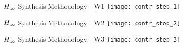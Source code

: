 \documentclass[../main/main.tex]{subfiles}
\begin{document}
\begin{frame}{\(H_{\infty}\) Synthesis Methodology - W1}
  \centering
  \texttt{[image: contr\_step\_1]}
\end{frame}

\begin{frame}{\(H_{\infty}\) Synthesis Methodology - W2}
  \centering
  \texttt{[image: contr\_step\_2]}
\end{frame}

\begin{frame}{\(H_{\infty}\) Synthesis Methodology - W3}
  \centering
  \texttt{[image: contr\_step\_3]}
\end{frame}
\end{document}
